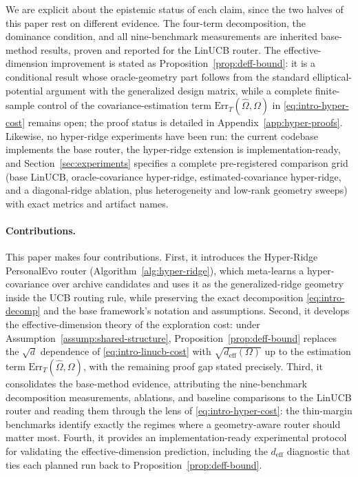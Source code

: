 \documentclass{article} %
\begin{document}
We are explicit about the epistemic status of each claim, since the two halves of this paper rest on different evidence. The four-term decomposition, the dominance condition, and all nine-benchmark measurements are inherited base-method results, proven and reported for the LinUCB router. The effective-dimension improvement is stated as Proposition~\ref{prop:deff-bound}: it is a conditional result whose oracle-geometry part follows from the standard elliptical-potential argument with the generalized design matrix, while a complete finite-sample control of the covariance-estimation term $\mathrm{Err}_T(\widehat\Omega,\Omega)$ in \eqref{eq:intro-hyper-cost} remains open; the proof status is detailed in Appendix~\ref{app:hyper-proofs}. Likewise, no hyper-ridge experiments have been run: the current codebase implements the base router, the hyper-ridge extension is implementation-ready, and Section~\ref{sec:experiments} specifies a complete pre-registered comparison grid (base LinUCB, oracle-covariance hyper-ridge, estimated-covariance hyper-ridge, and a diagonal-ridge ablation, plus heterogeneity and low-rank geometry sweeps) with exact metrics and artifact names.

\paragraph{Contributions.}
This paper makes four contributions. First, it introduces the Hyper-Ridge PersonalEvo router (Algorithm~\ref{alg:hyper-ridge}), which meta-learns a hyper-covariance over archive candidates and uses it as the generalized-ridge geometry inside the UCB routing rule, while preserving the exact decomposition \eqref{eq:intro-decomp} and the base framework's notation and assumptions. Second, it develops the effective-dimension theory of the exploration cost: under Assumption~\ref{assump:shared-structure}, Proposition~\ref{prop:deff-bound} replaces the $\sqrt{d}$ dependence of \eqref{eq:intro-linucb-cost} with $\sqrt{d_{\mathrm{eff}}(\Omega)}$ up to the estimation term $\mathrm{Err}_T(\widehat\Omega,\Omega)$, with the remaining proof gap stated precisely. Third, it consolidates the base-method evidence, attributing the nine-benchmark decomposition measurements, ablations, and baseline comparisons to the LinUCB router and reading them through the lens of \eqref{eq:intro-hyper-cost}: the thin-margin benchmarks identify exactly the regimes where a geometry-aware router should matter most. Fourth, it provides an implementation-ready experimental protocol for validating the effective-dimension prediction, including the $d_{\mathrm{eff}}$ diagnostic that ties each planned run back to Proposition~\ref{prop:deff-bound}.
\end{document}

